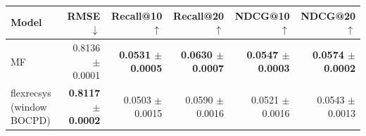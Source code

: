 \begin{tabular}{lrrrrr}
\toprule
Model & RMSE $\downarrow$ & Recall@10 $\uparrow$ & Recall@20 $\uparrow$ & NDCG@10 $\uparrow$ & NDCG@20 $\uparrow$ \\
\midrule
MF & 0.8136 $\pm$ 0.0001 & \textbf{0.0531 $\pm$ 0.0005} & \textbf{0.0630 $\pm$ 0.0007} & \textbf{0.0547 $\pm$ 0.0003} & \textbf{0.0574 $\pm$ 0.0002} \\
flexrecsys (window BOCPD) & \textbf{0.8117 $\pm$ 0.0002} & 0.0503 $\pm$ 0.0015 & 0.0590 $\pm$ 0.0016 & 0.0521 $\pm$ 0.0016 & 0.0543 $\pm$ 0.0013 \\
\bottomrule
\end{tabular}
